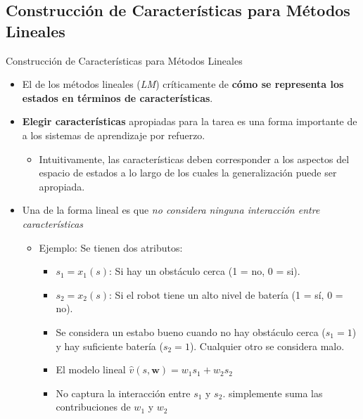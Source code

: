 \documentclass[10pt, envcountsect, handout, aspectratio=1610, hyperref={hypertexnames=true}]{beamer}
\begin{document}

\subsection{Construcción de Características para Métodos Lineales}



\begin{frame}{Construcción de Características para Métodos Lineales}
	
	
	\begin{itemize}
		\item El  de los métodos lineales (\textit{LM})  críticamente de \textbf{cómo se representa los estados  en términos de características}.
		
		\item \textbf{Elegir características} apropiadas para la tarea es una forma importante de  a los sistemas de aprendizaje por refuerzo.
		\begin{itemize}
			\item Intuitivamente, las características deben corresponder a los aspectos del espacio de estados a lo largo de los cuales la generalización puede ser apropiada.
		\end{itemize}
		
		\item Una  de la forma lineal es que \textit{no considera ninguna interacción entre características}
		\begin{itemize}
			\item Ejemplo: Se tienen dos atributos:
				\begin{itemize}
					\item \( s_1 = x_1(s)\): Si hay un obstáculo cerca (1 = no, 0 = si).  
					\item \( s_2 = x_2(s) \): Si el robot tiene un alto nivel de batería (1 = sí, 0 = no).  
	 
				
			\item Se considera un estabo bueno cuando no hay obstáculo cerca (\( s_1 = 1 \)) y hay suficiente batería (\( s_2 = 1 \)). Cualquier otro se considera malo.
			
			\item El modelo lineal $\hat{v}(s, \mathbf{w}) = w_1 s_1 + w_2 s_2$ 
					\item[]\qquad  
					No captura la interacción entre \( s_1 \) y \( s_2 \).
					simplemente suma las contribuciones de \( w_1 \) y \( w_2 \)
		

\end{itemize}
\end{itemize}
\end{itemize}
\end{frame}
\end{document}
